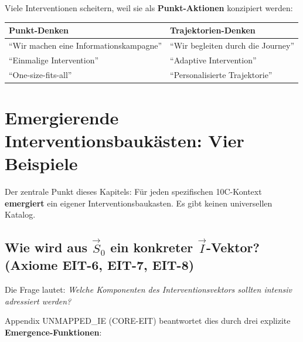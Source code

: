 Viele Interventionen scheitern, weil sie als \textbf{Punkt-Aktionen} konzipiert werden:

\begin{center}
\begin{tabular}{@{}ll@{}}
\toprule
\textbf{Punkt-Denken} & \textbf{Trajektorien-Denken} \\
\midrule
``Wir machen eine Informationskampagne'' & ``Wir begleiten durch die Journey'' \\
``Einmalige Intervention'' & ``Adaptive Intervention'' \\
``One-size-fits-all'' & ``Personalisierte Trajektorie'' \\
\bottomrule
\end{tabular}
\end{center}



\section{Emergierende Interventionsbauk\"{a}sten: Vier Beispiele}
\label{sec:17-examples}

Der zentrale Punkt dieses Kapitels: F\"{u}r jeden spezifischen 10C-Kontext \textbf{emergiert} ein eigener Interventionsbaukasten. Es gibt keinen universellen Katalog.

\subsection{Wie wird aus $\vec{S}_0$ ein konkreter $\vec{I}$-Vektor? (Axiome EIT-6, EIT-7, EIT-8)}
\label{sec:17-emergence-functions}

Die Frage lautet: \textit{Welche Komponenten des Interventionsvektors sollten intensiv adressiert werden?}

Appendix UNMAPPED_IE (CORE-EIT) beantwortet dies durch drei explizite \textbf{Emergence-Funktionen}:

